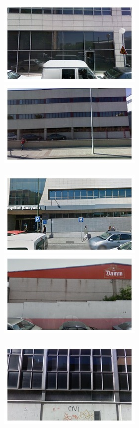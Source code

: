 \begin{figure}[t]
  \begin{minipage}{\linewidth}
    \begin{minipage}{0.3\linewidth}
      \includegraphics[width=0.49\linewidth]{imgs/arch/mosaicsS4/mosaic0000.jpg}
      \includegraphics[width=0.49\linewidth]{imgs/arch/mosaicsS4/mosaic0001.jpg}
      \\ \vspace{-3mm} \\
      \includegraphics[width=0.49\linewidth]{imgs/arch/mosaicsS4/mosaic0002.jpg}
      \includegraphics[width=0.49\linewidth]{imgs/arch/mosaicsS4/mosaic0003.jpg}
      \\ \vspace{-3mm} \\
      \includegraphics[width=0.49\linewidth]{imgs/arch/mosaicsS4/mosaic0004.jpg}

\end{minipage}
\end{minipage}
\end{figure}
